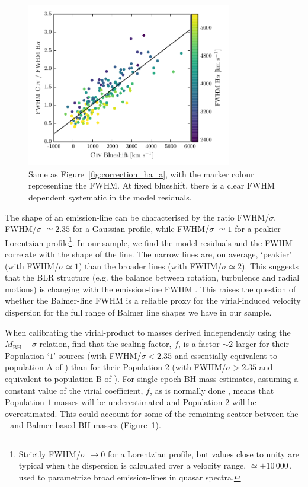 \begin{figure}
    \centering 
    \includegraphics[width=0.8\textwidth]{figures/chapter03/fwhm_correction_color.pdf}  
    \caption[{Same as Figure~\ref{fig:correction_ha_a}, with the marker colour representing the \ha FWHM.}]{Same as Figure~\ref{fig:correction_ha_a}, with the marker colour representing the \ha FWHM. At fixed  blueshift, there is a clear \ha FWHM dependent systematic in the model residuals.}   
    \label{fig:residuals_ha_fwhm}
\end{figure}


The shape of an emission-line can be characterised by the ratio FWHM/$\sigma$.  
FWHM/$\sigma$ $\simeq 2.35$ for a Gaussian profile, while FWHM/$\sigma$ $\simeq 1$ for a peakier Lorentzian profile\footnote{Strictly FWHM/$\sigma$ $\rightarrow 0$ for a Lorentzian profile, but values close to unity are typical when the dispersion is calculated over a velocity range, $\simeq\pm10\,000$\,\kms, used to parametrize broad emission-lines in quasar spectra.}.
In our sample, we find the model residuals and the \ha FWHM correlate with the shape of the line.   
The narrow lines are, on average, `peakier' (with FWHM/$\sigma\simeq1$) than the broader lines (with FWHM/$\sigma\simeq2$).   
This suggests that the BLR structure (e.g. the balance between rotation, turbulence and radial motions) is changing with the emission-line FWHM \citep[e.g.][]{collin06,kollatschny11,Kollatschny13}. 
This raises the question of whether the Balmer-line FWHM is a reliable proxy for the virial-induced velocity dispersion for the full range of Balmer line shapes we have in our sample. 

When calibrating the virial-product to masses derived independently using the $M_{\text{BH}}-\sigma$ relation, \citet{collin06} find that the scaling factor, $f$, is a factor $\sim2$ larger for their Population `$1$' sources (with FWHM/$\sigma < 2.35$ and essentially equivalent to population A of \citealt{sulentic00b}) than for their Population $2$ (with FWHM/$\sigma > 2.35$ and equivalent to population B of \citealt{sulentic00b}). 
For single-epoch BH mass estimates, assuming a constant value of the virial coefficient, $f$, as is normally done \citep[e.g.][]{vestergaard06}, means that Population $1$ masses will be underestimated and Population $2$ will be overestimated.
This could account for some of the remaining scatter between the - and Balmer-based BH masses (Figure~\ref{fig:residuals_ha_fwhm}). 

